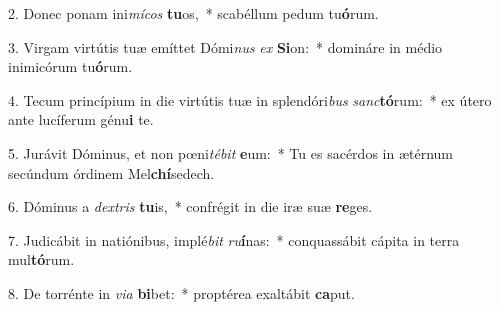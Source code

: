 2. Donec ponam ini\textit{mí}\textit{cos} \textbf{tu}os,~*  scabéllum pedum tu\textbf{ó}rum.\

3. Virgam virtútis tuæ emíttet Dómi\textit{nus} \textit{ex} \textbf{Si}on:~*  domináre in médio inimicórum tu\textbf{ó}rum.\

4. Tecum princípium in die virtútis tuæ in splendóri\textit{bus} \textit{sanc}\textbf{tó}rum:~*  ex útero ante lucíferum génu\textbf{i} te.\

5. Jurávit Dóminus, et non pœni\textit{té}\textit{bit} \textbf{e}um:~*  Tu es sacérdos in ætérnum secúndum órdinem Mel\textbf{chí}sedech.\

6. Dóminus a \textit{dex}\textit{tris} \textbf{tu}is,~*  confrégit in die iræ suæ \textbf{re}ges.\

7. Judicábit in natiónibus, implé\textit{bit} \textit{ru}\textbf{í}nas:~*  conquassábit cápita in terra mul\textbf{tó}rum.\

8. De torrénte in \textit{vi}\textit{a} \textbf{bi}bet:~*  proptérea exaltábit \textbf{ca}put.\

